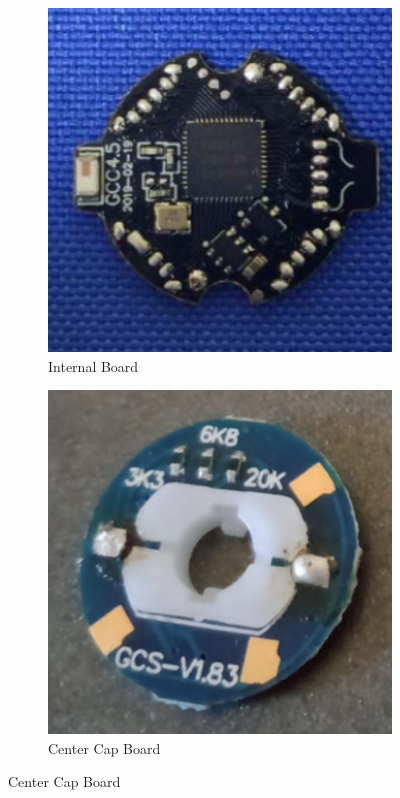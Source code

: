 \begin{figure}[h]
    \centering
    \caption{The internal components of the Giiker Cube}
    \label{fig:giiker-internal-components}
    \begin{subfigure}{0.25\textwidth}
        \centering
        \caption{Internal Board \cite{giiker-internals}}
        \label{fig:giiker-internal-board}
        \includegraphics[width=.90\linewidth]{Figures/3 State of the Art/giiker-internal-board.png}
    \end{subfigure}%
    \begin{subfigure}{0.25\textwidth}
        \centering
        \caption{Center Cap Board \cite{eggins-giiker-internals}}
        \label{fig:giiker-center-front}
        \includegraphics[width=.90\linewidth]{Figures/3 State of the Art/giiker-center-front.png}

\end{subfigure}
\end{figure}
